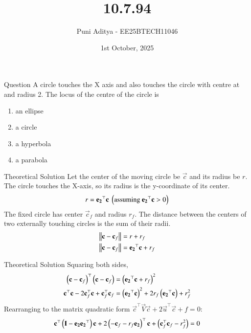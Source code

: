 \documentclass{beamer}
\title{10.7.94}
\date{1st October, 2025}
\author{Puni Aditya - EE25BTECH11046}
\begin{document}
\frame{\titlepage}
\begin{frame}{Question}
A circle touches the X axis and also touches the circle with centre at  and radius 2. The locus of the centre of the circle is
\begin{enumerate}
    \item an ellipse
    \item a circle
    \item a hyperbola
    \item a parabola
\end{enumerate}
\end{frame}

\begin{frame}{Theoretical Solution}
Let the center of the moving circle be $\vec{c}$ and its radius be $r$.
The circle touches the X-axis, so its radius is the y-coordinate of its center.
\begin{align}
    r = \mathbf{e_2}^\top\mathbf{c} \text{ } \left(\text{assuming } \mathbf{e_2}^\top\mathbf{c}>0\right)
\end{align}
The fixed circle has center $\vec{c}_f$ and radius $r_f$. The distance between the centers of two externally touching circles is the sum of their radii.
\begin{align}
    \left\lVert\mathbf{c}-\mathbf{c}_f\right\rVert &= r + r_f \\
    \left\lVert\mathbf{c}-\mathbf{c}_f\right\rVert &= \mathbf{e_2}^\top\mathbf{c} + r_f
\end{align}
\end{frame}

\begin{frame}{Theoretical Solution}
Squaring both sides,
\begin{align}
    \left(\mathbf{c}-\mathbf{c}_f\right)^\top\left(\mathbf{c}-\mathbf{c}_f\right) &= \left(\mathbf{e_2}^\top\mathbf{c} + r_f\right)^2 \\
    \mathbf{c}^\top\mathbf{c} - 2\mathbf{c}_f^\top\mathbf{c} + \mathbf{c}_f^\top\mathbf{c}_f &= \left(\mathbf{e_2}^\top\mathbf{c}\right)^2 + 2r_f\left(\mathbf{e_2}^\top\mathbf{c}\right) + r_f^2
\end{align}
Rearranging to the matrix quadratic form $\vec{c}^\top\vec{V}\vec{c} + 2\vec{u}^\top\vec{c} + f = 0$:
\begin{align}
    \mathbf{c}^\top\left(\mathbf{I}-\mathbf{e_2}\mathbf{e_2}^\top\right)\mathbf{c} + 2\left(-\mathbf{c}_f - r_f\mathbf{e_2}\right)^\top\mathbf{c} + \left(\mathbf{c}_f^\top\mathbf{c}_f-r_f^2\right) = 0
\end{align}
\end{frame}
\end{document}
